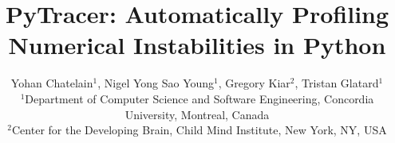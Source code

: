 \documentclass[10pt,journal,compsoc]{IEEEtran}
\begin{document}
\makeatletter
\let\orig@lstnumber=\thelstnumber
\newcommand\lstsetnumber[1]{\gdef\thelstnumber{#1}}
\newcommand\lstresetnumber{\global\let\thelstnumber=\orig@lstnumber}
\makeatother

%
\title{PyTracer: Automatically Profiling Numerical Instabilities in Python}
%
%
%
%

\author{Yohan Chatelain$^1$, Nigel Yong Sao Young$^1$,  Gregory Kiar$^2$,
    Tristan Glatard$^1$\\
    $^1$Department of Computer Science and Software Engineering, Concordia
    University, Montreal, Canada\\
    $^2$Center for the Developing Brain, Child Mind Institute, New York, NY,
    USA}
\end{document}
